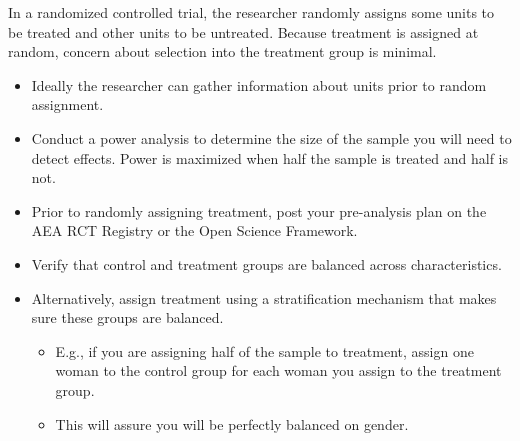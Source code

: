 \documentclass[10pt,a4paper]{protocol}
\begin{document}







\begin{fullwidth}
\makeheader
\end{fullwidth}

In a randomized controlled trial, the researcher randomly assigns some units to be treated and other units to be untreated. Because treatment is assigned at random, concern about selection into the treatment group is minimal.


\begin{itemize}
\item Ideally the researcher can gather information about units prior to random assignment.
\end{itemize}
\divider



\begin{itemize}
    \item Conduct a power analysis to determine the size of the sample you will need to detect effects. Power is maximized when half the sample is treated and half is not.
    \item Prior to randomly assigning treatment, post your pre-analysis plan on the AEA RCT Registry or the Open Science Framework. 
	\item Verify that control and treatment groups are balanced across characteristics.
	\item Alternatively, assign treatment using a stratification mechanism that makes sure these groups are balanced.
	\begin{itemize}
	    \item E.g., if you are assigning half of the sample to treatment, assign one woman to the control group for each woman you assign to the treatment group.
	    \item This will assure you will be perfectly balanced on gender.
	\end{itemize}
\end{itemize}
\divider
\end{document}
